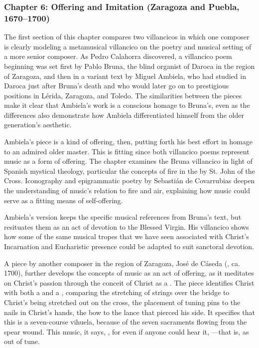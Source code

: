 \documentclass{vcbook-proposal}
\begin{document}
\subsubsection{Chapter 6: Offering and Imitation (Zaragoza and Puebla,
1670--1700)}


The first section of this chapter compares two villancicos in which one composer
is clearly modeling a metamusical villancico on the poetry and musical setting
of a more senior composer.
As Pedro Calahorra discovered, a villancico poem beginning  was set first by Pablo Bruna, the blind organist of Daroca in 
the region of Zaragoza, and then in a variant text by Miguel Ambiela, who had 
studied in Daroca just after Bruna's death and who would later go on to 
prestigious positions in Lérida, Zaragoza, and Toledo.%
  \Autocite{Calahorra:Suban}
The similarities between the pieces make it clear that Ambiela's work is a 
conscious homage to Bruna's, even as the differences also demonstrate how 
Ambiela differentiated himself from the older generation's aesthetic. 

Ambiela's piece is a kind of offering, then, putting forth his best effort in 
homage to an admired older master.
This is fitting since both villancico poems represent music as a form of 
offering.
The chapter examines the Bruna villancico in light of Spanish mystical 
theology, particular the concepts of fire in the  by St. John of the Cross.
Iconography and epigrammatic poetry by Sebastián de Covarrubias deepen the
understanding of music's relation to fire and air, explaining how music could
serve as a fitting means of self-offering.

Ambiela's version keeps the specific musical references from Bruna's text, but 
resituates them as an act of devotion to the Blessed Virgin.
His villancico shows how some of the same musical tropes that we have seen 
associated with Christ's Incarnation and Eucharistic presence could be adapted 
to suit sanctoral devotion. 


A piece by another composer in the region of Zaragoza, José de Cáseda 
(, ca. 1700), further develops the concepts of 
music as an act of offering, as it meditates on Christ's passion through the 
conceit of Christ as a . 
The piece identifies Christ with both a  and a , 
comparing the stretching of strings over the bridge to Christ's being stretched 
out on the cross, the placement of tuning pins to the nails in Christ's hands, 
the bow to the lance that pierced his side.
It specifies that this is a seven-course vihuela, because of the seven 
sacraments flowing from the spear wound.
This music, it says, , for even if anyone could 
hear it, ---that is, as out of tune. 
\end{document}
